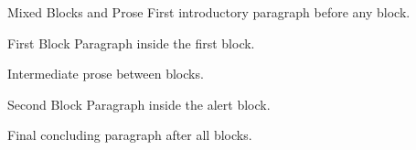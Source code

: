 \documentclass[14pt,t]{beamer}
\begin{document}
\begin{frame}{Mixed Blocks and Prose}
First introductory paragraph before any block.

\begin{block}{First Block}
Paragraph inside the first block.
\end{block}

Intermediate prose between blocks.

\begin{alertblock}{Second Block}
Paragraph inside the alert block.
\end{alertblock}

Final concluding paragraph after all blocks.
\end{frame}
\end{document}
